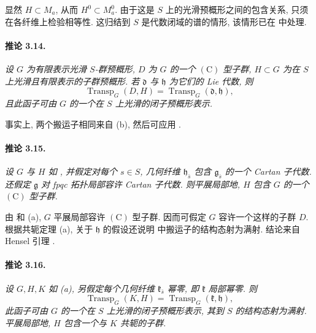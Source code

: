 显然 \(H\subset M_a\), 从而 \(H^0\subset M_a^0\). 由于这是 \(S\) 上的光滑预概形之间的包含关系, 只须在各纤维上检验相等性. 这归结到 \(S\) 是代数闭域的谱的情形, 该情形已在  中处理.

\paragraph{\textbf{推论 3.14.}}
{\itshape 设 \(G\) 为有限表示光滑 \(S\)-群预概形, \(D\) 为 \(G\) 的一个 \((\mathrm C)\) 型子群, \(H\subset G\) 为在 \(S\) 上光滑且有限表示的子群预概形. 若 \(\mathfrak d\) 与 \(\mathfrak h\) 为它们的 Lie 代数, 则
\[
  \operatorname{Transp}_G(D,H)
  =
  \operatorname{Transp}_G(\mathfrak d,\mathfrak h),
\]
且此函子可由 \(G\) 的一个在 \(S\) 上光滑的闭子预概形表示.}

事实上, 两个搬运子相同来自 \textup{(b)}, 然后可应用 .

\paragraph{\textbf{推论 3.15.}}
{\itshape 设 \(G\) 与 \(H\) 如 , 并假定对每个 \(s\in S\), 几何纤维 \(\mathfrak h_{\bar s}\) 包含 \(\mathfrak g_{\bar s}\) 的一个 Cartan 子代数. 还假定 \(\mathfrak g\) 对 fpqc 拓扑局部容许 Cartan 子代数. 则平展局部地, \(H\) 包含 \(G\) 的一个 \((\mathrm C)\) 型子群.}

由  和 \textup{(a)}, \(G\) 平展局部容许 \((\mathrm C)\) 型子群. 因而可假定 \(G\) 容许一个这样的子群 \(D\). 根据共轭定理 \textup{(a)}, 关于 \(\mathfrak h\) 的假设还说明  中搬运子的结构态射为满射. 结论来自 Hensel 引理 .



\paragraph{\textbf{推论 3.16.}}
{\itshape 设 \(G,H,K\) 如 \textup{(a)}, 另假定每个几何纤维 \(\mathfrak k_{\bar s}\) 幂零, 即 \(\mathfrak k\) 局部幂零. 则
\[
  \operatorname{Transp}_G(K,H)
  =
  \operatorname{Transp}_G(\mathfrak k,\mathfrak h),
\]
此函子可由 \(G\) 的一个在 \(S\) 上光滑的闭子预概形表示, 其到 \(S\) 的结构态射为满射. 平展局部地, \(H\) 包含一个与 \(K\) 共轭的子群.}


